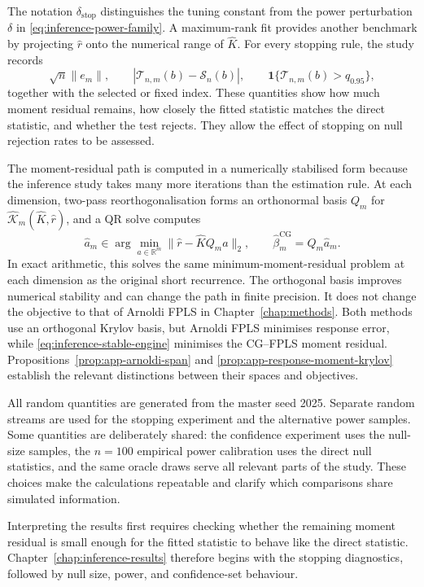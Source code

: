 The notation $\delta_{\mathrm{stop}}$ distinguishes the tuning constant from
the power perturbation $\delta$ in \eqref{eq:inference-power-family}.  A
maximum-rank fit provides another benchmark by projecting $\widehat r$ onto
the numerical range of $\widehat K$.  For every stopping rule, the study
records
\begin{equation}
    \sqrt n\|e_m\|,
    \qquad
    |\mathcal T_{n,m}(b)-\mathcal S_n(b)|,
    \qquad
    \mathbf 1\{\mathcal T_{n,m}(b)>q_{0.95}\},
    \label{eq:inference-stopping-diagnostics}
\end{equation}
together with the selected or fixed index.  These quantities show how much
moment residual remains, how closely the fitted statistic matches the direct
statistic, and whether the test rejects.  They allow the effect of stopping
on null rejection rates to be assessed.

The moment-residual path is computed in a numerically stabilised form because
the inference study takes many more iterations than the estimation rule.
At each dimension, two-pass reorthogonalisation forms an orthonormal basis
$Q_m$ for $\widehat{\mathcal K}_m(\widehat K,\widehat r)$, and a QR solve
computes
\begin{equation}
    \widehat a_m
    \in\arg\min_{a\in\mathbb R^m}
       \|\widehat r-\widehat KQ_ma\|_2,
    \qquad
    \widehat\beta_m^{\mathrm{CG}}=Q_m\widehat a_m.
    \label{eq:inference-stable-engine}
\end{equation}
In exact arithmetic, this solves the same minimum-moment-residual problem at
each dimension as the original short recurrence.  The orthogonal basis
improves numerical stability and can change the path in finite precision.
It does not change the objective to that of Arnoldi FPLS in
Chapter~\ref{chap:methods}.  Both methods use an orthogonal Krylov basis, but
Arnoldi FPLS minimises response error, while
\eqref{eq:inference-stable-engine} minimises the CG--FPLS moment residual.
Propositions~\ref{prop:app-arnoldi-span} and
\ref{prop:app-response-moment-krylov} establish the relevant distinctions
between their spaces and objectives.

All random quantities are generated from the master seed 2025.  Separate
random streams are used for the stopping experiment and the alternative
power samples.  Some quantities are deliberately shared: the confidence
experiment uses the null-size samples, the $n=100$ empirical power
calibration uses the direct null statistics, and the same oracle draws serve
all relevant parts of the study.  These choices make the calculations
repeatable and clarify which comparisons share simulated information.

Interpreting the results first requires checking whether the remaining
moment residual is small enough for the fitted statistic to behave like the
direct statistic.  Chapter~\ref{chap:inference-results} therefore begins
with the stopping diagnostics, followed by null size, power, and
confidence-set behaviour.
